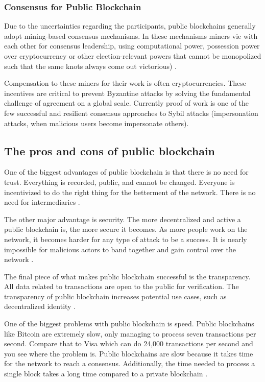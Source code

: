 \subsubsection{Consensus for Public Blockchain}\label{sec:consensoPublica}
Due to the uncertainties regarding the participants, public blockchains generally adopt mining-based consensus mechanisms. In these mechanisms miners vie with each other for consensus leadership, using computational power, possession power over cryptocurrency or other election-relevant powers that cannot be monopolized such that the same knots always come out victorious) \cite{greve2018blockchain}.

Compensation to these miners for their work is often cryptocurrencies. These incentives are critical to prevent Byzantine attacks by solving the fundamental challenge of agreement on a global scale. Currently proof of work is one of the few successful and resilient consensus approaches to Sybil attacks \cite{douceur2002sybil} (impersonation attacks, when malicious users become impersonate others).

\subsection{The pros and cons of public blockchain}\label{sec:prosConsPub}

One of the biggest advantages of public blockchain is that there is no need for trust. Everything is recorded, public, and cannot be changed. Everyone is incentivized to do the right thing for the betterment of the network. There is no need for intermediaries \cite{blockgeeks2018deeper}.

The other major advantage is security. The more decentralized and active a public blockchain is, the more secure it becomes. As more people work on the network, it becomes harder for any type of attack to be a success. It is nearly impossible for malicious actors to band together and gain control over the network \cite{selfkeyOrg}.

The final piece of what makes public blockchain successful is the transparency. All data related to transactions are open to the public for verification. The transparency of public blockchain increases potential use cases, such as decentralized identity \cite{Comstor2018}.

One of the biggest problems with public blockchain is speed. Public blockchains like Bitcoin are extremely slow, only managing to process seven transactions per second. Compare that to Visa which can do 24,000 transactions per second and you see where the problem is. Public blockchains are slow because it takes time for the network to reach a consensus. Additionally, the time needed to process a single block takes a long time compared to a private blockchain \cite{blockgeeks2018deeper}.

